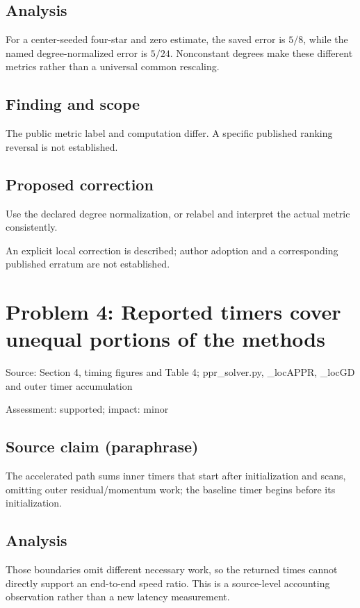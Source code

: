 \documentclass[11pt]{article}
\begin{document}
\subsection*{Analysis}

For a center-seeded four-star and zero estimate, the saved error is \(5/8\), while the named degree-normalized error is \(5/24\). Nonconstant degrees make these different metrics rather than a universal common rescaling.

\subsection*{Finding and scope}

The public metric label and computation differ. A specific published ranking reversal is not established.

\subsection*{Proposed correction}

Use the declared degree normalization, or relabel and interpret the actual metric consistently.

An explicit local correction is described; author adoption and a corresponding published erratum are not established.

\section*{Problem 4: Reported timers cover unequal portions of the methods}

Source: Section 4, timing figures and Table 4; ppr\_solver.py, \_locAPPR, \_locGD and outer timer accumulation

Assessment: supported; impact: minor

\subsection*{Source claim (paraphrase)}

The accelerated path sums inner timers that start after initialization and scans, omitting outer residual/momentum work; the baseline timer begins before its initialization.

\subsection*{Analysis}

Those boundaries omit different necessary work, so the returned times cannot directly support an end-to-end speed ratio. This is a source-level accounting observation rather than a new latency measurement.
\end{document}
